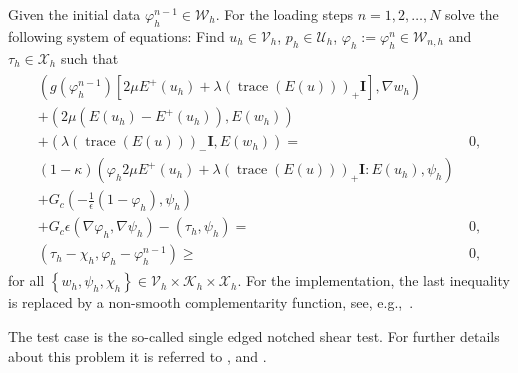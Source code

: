 Given the initial data $\varphi_h^{n-1} \in \mathcal{W}_h$.
For the loading steps $n=1,2,\ldots, N$ solve the following system of equations:
Find $u_h \in \mathcal{V}_h$, $p_h \in \mathcal{U}_h$, $\varphi_h:= \varphi_h^n \in \mathcal{W}_{n,h}$ and $\tau_h \in \mathcal{X}_h$ such that 
 \begin{align*}
 \begin{aligned}
   \left(g(\varphi_h^{n-1})\left[2\mu E^+(u_h) + \lambda (\operatorname{trace}(E(u)))_+ \textbf{I}\right],\nabla w_h \right)\\
  + \left(2\mu \left(E(u_h)-E^+(u_h)\right),E(w_h)\right)\\
 + \left(\lambda (\operatorname{trace}(E(u)))_- \textbf{I},E(w_h)\right) =&\ 0,\\
  (1- \kappa)\left(\varphi_h 2\mu E^+(u_h) + \lambda (\operatorname{trace}(E(u)))_+ \textbf{I} : E(u_h),\psi_h\right)\\
  + G_c \left(-\frac{1}{\epsilon} (1-\varphi_h),\psi_h\right)\\ 
  + G_c \epsilon \left(\nabla \varphi_h,\nabla\psi_h \right) - \left(\tau_h,\psi_h\right) =&\ 0,\\
\left(\tau_h - \chi_h,\varphi_h -\varphi_h^{n-1}\right)\geq&\ 0,
\end{aligned}
\end{align*}
for all $\left\{w_h,\psi_h,\chi_h\right\} \in \mathcal{V}_h \times
\mathcal{K}_h \times \mathcal{X}_h$.
For the implementation, the last inequality is replaced by a
non-smooth complementarity function, see, e.g.,~\cite[Section~4.1]{MangWallothWickWollner:2019}.

The test case is the so-called single edged notched 
shear test. For further details about this problem it is referred
to \cite{MieHofWel2010,BoVeScoHuLa12}, and \cite{WeWiWo2014}.





